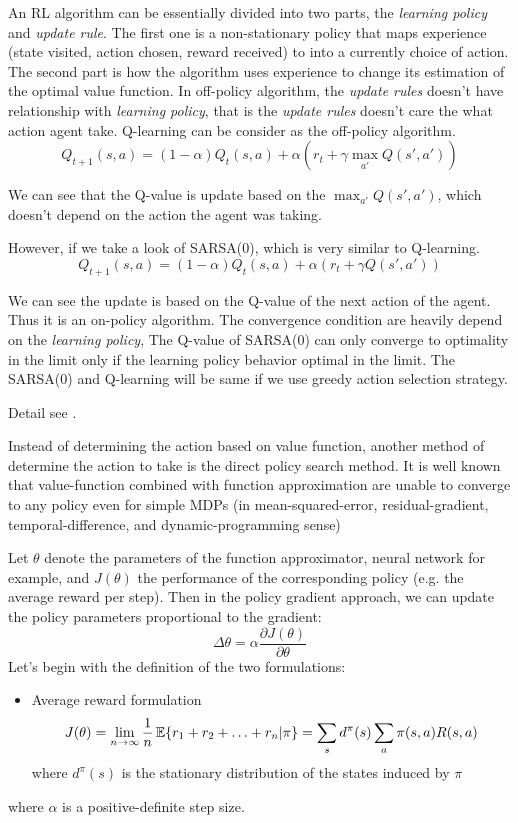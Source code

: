 \documentclass[9pt]{article}
\begin{document}
An RL algorithm can be essentially divided into two parts, the \textit{learning policy} and \textit{update rule}. The first one is a non-stationary policy that maps experience (state visited, action chosen, reward received) to into a currently choice of action. The second part is how the algorithm uses experience to change its estimation of the optimal value function.
In off-policy algorithm, the \textit{update rules} doesn't have relationship with \textit{learning policy}, that is the \textit{update rules} doesn't care the what action agent take. Q-learning can be consider as the off-policy algorithm.
\begin{displaymath}
  Q_{t+1}(s,a) = (1-\alpha)Q_{t}(s,a)+\alpha(r_t+\gamma \max_{a'}Q(s',a'))
\end{displaymath}

We can see that the Q-value is update based on the $\max_{a'}Q(s',a')$, which doesn't depend on the action the agent was taking.

However, if we take a look of SARSA(0), which is very similar to Q-learning.
\begin{displaymath}
  Q_{t+1}(s,a) = (1-\alpha)Q_{t}(s,a)+\alpha(r_t+\gamma Q(s',a'))
\end{displaymath}

We can see the update is based on the Q-value of the next action of the agent. Thus it is an on-policy algorithm. The convergence condition are heavily depend on the \textit{learning policy}, The Q-value of SARSA(0) can only converge to optimality in the limit only if the learning policy behavior optimal in the limit. The SARSA(0) and Q-learning will be same if we use greedy action selection strategy.

Detail see \citep{singh2000convergence}.



 Instead of determining the action based on value function, another method of determine the action to take is the direct policy search method. It is well known that value-function combined with function approximation are unable to converge to any policy even for simple MDPs (in mean-squared-error, residual-gradient, temporal-difference, and dynamic-programming sense) \lackcite 

Let \(\theta\) denote the parameters of the function approximator, neural network for example, and \(J(\theta)\) the performance of the corresponding policy (e.g. the average reward per step). Then in the policy gradient approach, we can update the policy parameters proportional to the gradient:
\[
\Delta\theta = \alpha \frac{\partial J(\theta)}{\partial \theta}
\]
Let's begin with the definition of the two formulations:
\begin{itemize}
\item Average reward formulation\\
\[
J(\theta) = \lim_{n\rightarrow \infty} \frac{1}{n} \operatorname{\mathbb{E}}\{r_1 + r_2 + \ldots + r_n | \pi\} = \sum_s d^{\pi}(s) \sum_a \pi(s,a) R(s,a)
\]
where \(d^{\pi}(s)\) is the stationary distribution of the states induced by \(\pi\)
\end{itemize}
where \(\alpha\) is a positive-definite step size.
\end{document}
